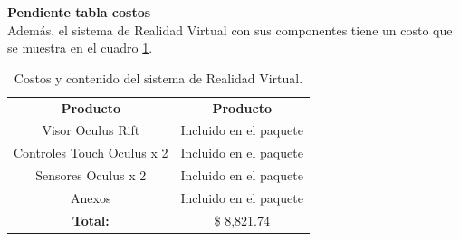 \textbf{Pendiente tabla costos}\\
Además, el sistema de Realidad Virtual con sus componentes tiene un costo que se muestra en el cuadro \ref{tab:t27}.
\begin{table}[H]
  \centering
  \begin{tabular}{|c|c|}
  \hline
  \rowcolor[HTML]{9B9B9B} 
  \multicolumn{2}{|c|}{\cellcolor[HTML]{9B9B9B}\textbf{Sistema de Realidad Virtual}} \\ \hline
  \rowcolor[HTML]{9B9B9B} 
  \textbf{Producto}                          & \textbf{Producto}                     \\ \hline
  Visor Oculus Rift                          & Incluido en el paquete                \\ \hline
  Controles Touch Oculus x 2                 & Incluido en el paquete                \\ \hline
  Sensores Oculus x 2                        & Incluido en el paquete                \\ \hline
  Anexos                                     & Incluido en el paquete                \\ \hline
  \textbf{Total:}                            & \$ 8,821.74                           \\ \hline
  \end{tabular}
  \caption{Costos y contenido del sistema de Realidad Virtual.}
  \label{tab:t27}
\end{table}

